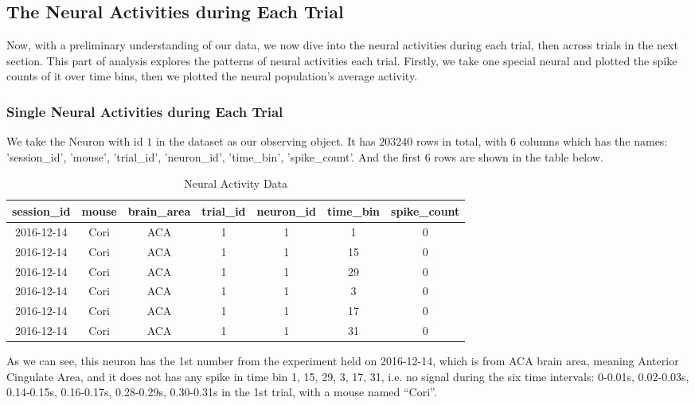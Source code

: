 \documentclass{article}
\begin{document}
	\subsection{The Neural Activities during Each Trial}
	\par Now, with a preliminary understanding of our data, we now dive into the neural activities during each trial, then across trials in the next section. This part of analysis explores the patterns of neural activities each trial. Firstly, we take one special neural and plotted the spike counts of it over time bins, then we plotted the neural population's average activity.
	\subsubsection{Single Neural Activities during Each Trial}
	\par We take the Neuron with id $1$ in the dataset as our observing object. It has $203240$ rows in total, with $6$ columns which has the names: 'session\_id', 'mouse', 'trial\_id', 'neuron\_id', 'time\_bin', 'spike\_count'. And the first $6$ rows are shown in the table below.
	\begin{table}[htbp]
		\begin{tabular}{ccccccc}
			\toprule
			\textbf{session\_id} & \textbf{mouse} & \textbf{brain\_area} & \textbf{trial\_id} & \textbf{neuron\_id} & \textbf{time\_bin} & \textbf{spike\_count} \\
			\midrule
			2016-12-14 & Cori & ACA & 1 & 1 & 1 & 0 \\
			2016-12-14 & Cori & ACA & 1 & 1 & 15 & 0 \\
			2016-12-14 & Cori & ACA & 1 & 1 & 29 & 0 \\
			2016-12-14 & Cori & ACA & 1 & 1 & 3 & 0 \\
			2016-12-14 & Cori & ACA & 1 & 1 & 17 & 0 \\
			2016-12-14 & Cori & ACA & 1 & 1 & 31 & 0 \\
			\bottomrule
		\end{tabular}
		\centering
		\caption{Neural Activity Data}
		\label{tab:neural_activity}
	\end{table}
	\par As we can see, this neuron has the 1st number from the experiment held on 2016-12-14, which is from ACA brain area, meaning Anterior Cingulate Area, and it does not has any spike in time bin 1, 15, 29, 3, 17, 31, i.e. no signal during the six time intervals: 0-0.01s, 0.02-0.03s, 0.14-0.15s, 0.16-0.17s, 0.28-0.29s, 0.30-0.31s in the 1st trial, with a mouse named ``Cori''.
\end{document}
